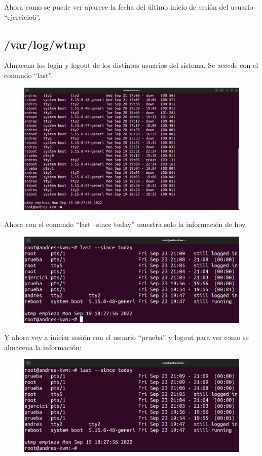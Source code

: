 \documentclass{article}
\begin{document}
Ahora como se puede ver aparece la fecha del último inicio de sesión del usuario ``ejercicio6''.

\subsection*{/var/log/wtmp}
Almacena los login y logout de los distintos usuarios del sistema. Se accede con el comando ``last''. 

\begin{figure}[H]
    \includegraphics[width=\textwidth]{imagenes/lastnormal.png}
\end{figure}

Ahora con el comando ``last --since today'' muestra solo la información de hoy.

\begin{figure}[H]
    \includegraphics[width=\textwidth]{imagenes/lasttoday.png}
\end{figure}

Y ahora voy a iniciar sesión con el usuario ``prueba'' y logout para ver como se almacena la información:

\begin{figure}[H]
    \includegraphics[width=\textwidth]{imagenes/lasttodayprueba.png}
\end{figure}
\end{document}
